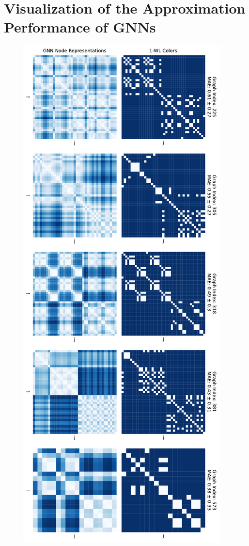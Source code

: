 \section{Visualization of the Approximation Performance of GNNs}
\begin{figure}[!ht]
    \centering
    \begin{minipage}[b]{0.45992852703\textwidth}
        \centering
        \includegraphics[width=\textwidth, left]{Figures/heatmaps_ENZYMES_0.pdf}

\end{minipage}
\end{figure}
